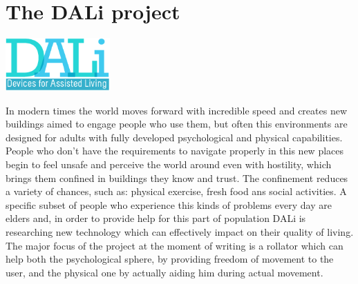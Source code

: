 \chapter{The DALi project}

\begin{center}
      \includegraphics[width=0.3\textwidth]{img/Dali-logo.png}
\end{center}
\vspace{1cm}

In modern times the world moves forward with incredible speed and creates new buildings aimed to engage people who use them, but often this environments are designed for adults with fully developed psychological and physical capabilities.
\newline
People who don't have the requirements to navigate properly in this new places begin to feel unsafe and perceive the world around even with hostility, which brings them confined in buildings they know and trust.
The confinement reduces a variety of chances, such as: physical exercise,
fresh food ans social activities.
\newline
A specific subset of people who experience this kinds of problems every day are elders and, in order to provide help for this part of population DALi is researching new technology which can effectively impact on their quality of living.
\newline
The major focus of the project at the moment of writing is a rollator which can help both the psychological sphere, by providing freedom of movement to the user, and the physical one by actually aiding him during actual movement.
\newline   



  

